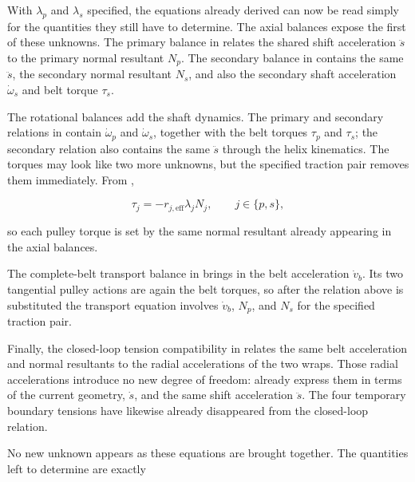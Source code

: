\documentclass[11pt]{report}
\numberwithin{equation}{section}
\begin{document}
With \(\lambda_p\) and \(\lambda_s\) specified, the equations already
derived can now be read simply for the quantities they still have to
determine. The axial balances expose the first of these unknowns. The primary balance in
 relates the shared shift
acceleration \(\ddot s\) to the primary normal resultant \(N_p\). The
secondary balance in  contains
the same \(\ddot s\), the secondary normal resultant \(N_s\), and also the
secondary shaft acceleration \(\dot\omega_s\) and belt torque \(\tau_s\).

The rotational balances add the shaft dynamics. The primary and secondary
relations in
contain \(\dot\omega_p\) and \(\dot\omega_s\), together with the belt torques
\(\tau_p\) and \(\tau_s\); the secondary relation also contains the same
\(\ddot s\) through the helix kinematics. The torques may look like two more
unknowns, but the specified traction pair removes them immediately. From
,

\begin{equation}
    \tau_j
    =
    -r_{j,\mathrm{eff}}\lambda_jN_j,
    \qquad
    j\in\{p,s\},
\end{equation}

so each pulley torque is set by the same normal resultant already appearing in
the axial balances.

The complete-belt transport balance in
 brings in the belt acceleration
\(\dot v_b\). Its two tangential pulley actions are again the belt torques, so
after the relation above is substituted the transport equation involves
\(\dot v_b\), \(N_p\), and \(N_s\) for the specified traction pair.

Finally, the closed-loop tension compatibility in
 relates the same belt acceleration
and normal resultants to the radial accelerations of the two wraps. Those
radial accelerations introduce no new degree of freedom:
 already
express them in terms of the current geometry, \(\dot s\), and the same shift
acceleration \(\ddot s\). The four temporary boundary tensions have likewise
already disappeared from the closed-loop relation.

No new unknown appears as these equations are brought together. The quantities
left to determine are exactly
\end{document}
